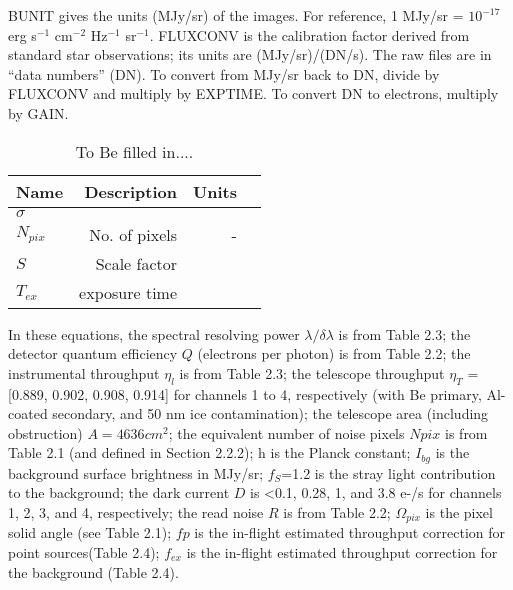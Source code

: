 \documentclass[11pt,a4paper]{article}
\begin{document}
\noindent
BUNIT gives the units (MJy/sr) of the images. For reference, 1 MJy/sr
= $10^{-17}$ erg s$^{-1}$ cm$^{-2}$ Hz$^{-1}$ sr$^{-1}$. FLUXCONV is
the calibration factor derived from standard star observations; its
units are (MJy/sr)/(DN/s). The raw files are in “data numbers”
(DN). To convert from MJy/sr back to DN, divide by FLUXCONV and
multiply by EXPTIME. To convert DN to electrons, multiply by GAIN.

\begin{table}
  \begin{center}
    \begin{tabular}{lrrr}
      \hline
      \hline
      Name    & Description      & Units  \\
      \hline 
      $\sigma$ &  & \\
      $N_{pix}$ & No. of pixels & - \\
      $S$  & Scale factor & & \\
      $T_{ex}$  & exposure time & \\
      \hline
      \hline
    \end{tabular}
    \caption{To Be filled in....}
    \label{tab:IRAC_handbook_Sec2}
  \end{center}
  \vspace{-8pt}
\end{table}
In these equations, the spectral resolving power $\lambda / \delta
\lambda$ is from Table 2.3; the detector quantum efficiency $Q$
(electrons per photon) is from Table 2.2; the instrumental throughput
$\eta_{l}$ is from Table 2.3; the telescope throughput $\eta_{T}$
=[0.889, 0.902, 0.908, 0.914] for channels 1 to 4, respectively (with
Be primary, Al-coated secondary, and 50 nm ice contamination); the
telescope area (including obstruction) $A=4636cm^{2}$; the equivalent
number of noise pixels $Npix$ is from Table 2.1 (and defined in
Section 2.2.2); h is the Planck constant; $I_{bg}$ is the background
surface brightness in MJy/sr; $f_{S}$=1.2 is the stray light
contribution to the background; the dark current $D$ is <0.1, 0.28, 1,
and 3.8 e-/s for channels 1, 2, 3, and 4, respectively; the read noise
$R$ is from Table 2.2; $\Omega_{pix}$ is the pixel solid angle (see
Table 2.1); $f p$ is the in-flight estimated throughput correction for
point sources(Table 2.4); $f_{ex}$ is the in-flight estimated
throughput correction for the background (Table 2.4).
\end{document}
